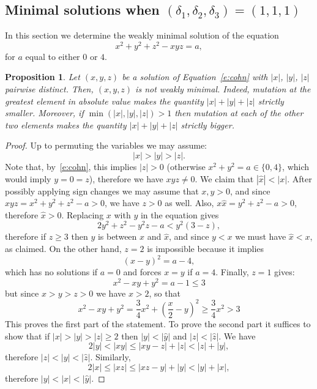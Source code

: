 \documentclass[11pt,a4paper]{amsart}
\newcommand{\de}{\delta}
\newtheorem{prop}[thm]{Proposition}
\theoremstyle{definition}
\numberwithin{equation}{section}
\begin{document}
\subsection{Minimal solutions when $(\de_1,\de_2,\de_3)=(1,1,1)$}\label{ss:111}

In this section we determine the weakly minimal solution of the equation 
\begin{equation}\label{e:cohn} 
x^2+y^2+z^2-xyz=a, 
\end{equation}
for $a$ equal to either $0$ or $4$.

\begin{prop}\label{p:cohn} 
	Let $(x,y,z)$ be a solution of Equation~\eqref{e:cohn} with $|x|$, $|y|$, $|z|$ pairwise distinct. 
	Then, $(x,y,z)$ is not weakly minimal. Indeed, mutation at the greatest element in absolute
	value makes the quantity $|x|+|y|+|z|$ strictly smaller. Moreover, if $\min(|x|,|y|,|z|)>1$ then mutation at each of the other two elements makes the quantity $|x|+|y|+|z|$ strictly bigger. 
\end{prop}

\begin{proof} 
	Up to permuting the variables we may assume:
	$$
	|x| > |y| > |z|.
	$$
	Note that, by~\eqref{e:cohn}, this implies $|z|>0$ (otherwise $x^2+y^2=a \in \{0,4 \}$, which would imply $y=0=z$), therefore we have $xyz\neq 0$.   
	We claim that $|\hat x|<|x|$. After possibly applying sign changes we may assume that 
	$x,y>0$, and since $xyz = x^2+y^2+z^2-a >0$, we have $z>0$ as well. Also, $x\hat{x} = y^2+z^2-a>0$, 
	therefore $\hat{x}>0$. Replacing $x$ with $y$ in the equation gives 
	\[
	2y^2 + z^2 - y^2 z-a < y^2(3-z),
	\]
	therefore if $z\geq 3$ then $y$ is between $x$ and $\hat{x}$, and since $y<x$ we must have $\hat{x}<x$, 
	as claimed. On the other hand, $z=2$ is impossible because it implies  
	\[
	(x-y)^2=a-4,
	\]
    which has no solutions if $a=0$ and forces $x=y$ if $a=4$. Finally, $z=1$ gives:  
    \[
    x^2-xy+y^2=a-1 \le 3
    \]
    but since $x>y>z>0$ we have $x >2$, so that
    \[
    x^2-xy+y^2=\dfrac{3}{4} x^2+ \left( \dfrac{x}{2} -y \right)^2 \ge \dfrac{3}{4} x^2>3
    \]
	This proves the first part of the statement. To prove the second part it suffices to show that if $|x|>|y|>|z|\geq 2$ then $|y|<|\hat{y}|$ and $|z|<|\hat{z}|$. We have 
	$$
	2|y| < |xy| \leq |xy -z| + |z| < |\hat{z}| + |y|,
	$$
	therefore $|z|<|y|<|\hat z|$. Similarly, 
	$$
	2|x|\leq |xz| \leq |xz - y| + |y| < |\hat{y}| + |x|,
	$$
	therefore $|y|<|x|<|\hat y|$. 
\end{proof}
\end{document}
